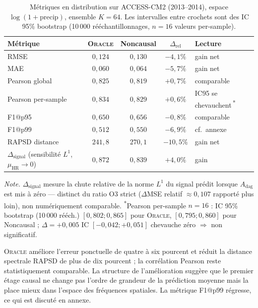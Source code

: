 \documentclass[14pt,a4paper,openany]{extreport}
\newcommand{\Oracle}{\textsc{Oracle}}
\newcommand{\HR}{\ensuremath{\text{HR}}}
\newcommand{\muHR}{\ensuremath{\mu_{\HR}}}
\newcommand{\Adag}{\ensuremath{A_{\mathrm{dag}}}}
\begin{document}
\begin{table}[ht]
  \centering
  \small
  \caption[Métriques en distribution]{Métriques en distribution sur ACCESS-CM2 (2013--2014), espace $\log(1 + \mathrm{precip})$, ensemble $K = 64$. Les intervalles entre crochets sont des IC 95\% bootstrap (10\,000 rééchantillonnages, $n=16$ valeurs per-sample).}
  \label{tab:exp-res-id}
  \begin{tabularx}{\linewidth}{l c c c X}
    \toprule
    \textbf{Métrique} & \Oracle{} & \textbf{Noncausal} & $\Delta_{\mathrm{rel}}$ & \textbf{Lecture} \\
    \midrule
    RMSE & $0{,}124$ & $0{,}130$ & $-4{,}1\%$ & gain net \\
    MAE & $0{,}060$ & $0{,}064$ & $-5{,}7\%$ & gain net \\
    Pearson global & $0{,}825$ & $0{,}819$ & $+0{,}7\%$ & comparable \\
    Pearson per-sample & $0{,}834$ & $0{,}829$ & $+0{,}6\%$ & IC95 se chevauchent\,\textsuperscript{*} \\
    F1@p95 & $0{,}650$ & $0{,}656$ & $-0{,}8\%$ & comparable \\
    F1@p99 & $0{,}512$ & $0{,}550$ & $-6{,}9\%$ & cf.~annexe \\
    RAPSD distance & $241{,}8$ & $270{,}1$ & $-10{,}5\%$ & gain net \\
    $\Delta_{\mathrm{signal}}$ (sensibilité $L^1$, $\muHR \to 0$) & $0{,}872$ & $0{,}839$ & $+4{,}0\%$ & gain \\
    \bottomrule
  \end{tabularx}
  \vspace{0.3em}
  \footnotesize
  \emph{Note.} $\Delta_{\mathrm{signal}}$ mesure la chute relative de la norme $L^1$ du signal prédit lorsque $\Adag$ est mis à zéro --- distinct du ratio O3 strict ($\Delta$MSE relatif $\approx 0{,}107$ rapporté plus loin), non numériquement comparable. \textsuperscript{*}Pearson per-sample $n=16$ : IC 95\% bootstrap (10\,000 rééch.) $[0{,}802; 0{,}865]$ pour \Oracle{}, $[0{,}795; 0{,}860]$ pour Noncausal ; $\Delta = +0{,}005$ IC $[-0{,}042; +0{,}051]$ chevauche zéro $\Rightarrow$ non significatif.
\end{table}

\Oracle{} améliore l'erreur ponctuelle de quatre à six pourcent et réduit la distance spectrale RAPSD de plus de dix pourcent ; la corrélation Pearson reste statistiquement comparable. La structure de l'amélioration suggère que le premier étage causal ne change pas l'ordre de grandeur de la prédiction moyenne mais la place mieux dans l'espace des fréquences spatiales. La métrique F1@p99 régresse, ce qui est discuté en annexe.
\end{document}
